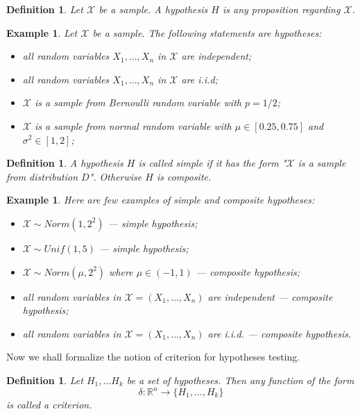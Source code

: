 \documentclass[12pt]{article}
\newtheorem{definition}[theorem]{Definition}
\newtheorem{example}[theorem]{Example}
\begin{document}
\begin{definition} Let $\mathscr{X}$ be a sample. A hypothesis $H$ is any proposition regarding $\mathscr{X}$. 
\end{definition}

\begin{example} Let $\mathscr{X}$ be a sample. The following statements are hypotheses:
\begin{itemize} 
    \item all random variables $X_1,\ldots,X_n$ in $\mathscr{X}$ are independent; 
    \item all random variables $X_1,\ldots,X_n$ in $\mathscr{X}$ are i.i.d;
    \item $\mathscr{X}$ is a sample from Bernoulli random variable with $p=1/2$;
    \item $\mathscr{X}$ is a sample from normal random variable with $\mu\in[0.25,0.75]$ and $\sigma^2\in[1,2]$;
\end{itemize}
\end{example}

\begin{definition} A hypothesis $H$ is called simple if it has the form "$\mathscr{X}$ is a sample from distribution $D$". Otherwise $H$ is composite.
\end{definition}

\begin{example} Here are few examples of simple and composite hypotheses:
\begin{itemize}
    \item $\mathscr{X}\sim Norm(1, 2^2)$ --- simple hypothesis;
    \item $\mathscr{X}\sim Unif(1, 5)$ --- simple hypothesis;
    \item $\mathscr{X}\sim Norm(\mu, 2^2)$ where $\mu\in(-1,1)$ --- composite hypothesis;
    \item all random variables in $\mathscr{X}=(X_1,\ldots,X_n)$ are independent --- composite hypothesis;
    \item all random variables in $\mathscr{X}=(X_1,\ldots,X_n)$ are i.i.d. --- composite hypothesis.
\end{itemize}
\end{example}

Now we shall formalize the notion of criterion for hypotheses testing.

\begin{definition} Let $H_1,\ldots H_k$ be a set of hypotheses. Then any function of the form
$$
\delta:\mathbb{R}^n\to \{H_1,\ldots, H_k\}
$$
is called a criterion.
\end{definition}
\end{document}
